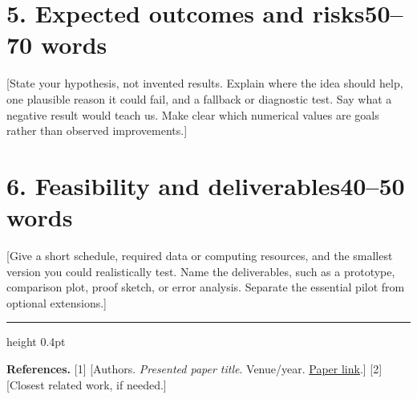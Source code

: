 \documentclass[11pt, letterpaper]{article}
\newcommand{\wordbudget}[1]{{\normalfont\small\color{SecondaryText}\hfill #1 words}}
\newcommand{\referencesheading}{%
  \par\vspace{4pt}
  {\color{ProposalBlue}\hrule height 0.4pt}
  \vspace{3pt}
}
\begin{document}
\section*{5. Expected outcomes and risks\wordbudget{50--70}}
[State your hypothesis, not invented results. Explain where the idea should help,
one plausible reason it could fail, and a fallback or diagnostic test. Say what a
negative result would teach us. Make clear which numerical values are goals rather
than observed improvements.]

\section*{6. Feasibility and deliverables\wordbudget{40--50}}
[Give a short schedule, required data or computing resources, and the smallest
version you could realistically test. Name the deliverables, such as a prototype,
comparison plot, proof sketch, or error analysis. Separate the essential pilot from
optional extensions.]

\vfill
\referencesheading
{\small\textbf{References.} [1] [Authors. \textit{Presented paper title}. Venue/year.
\href{https://example.com}{Paper link}.] [2] [Closest related work, if needed.]\par}
\end{document}
